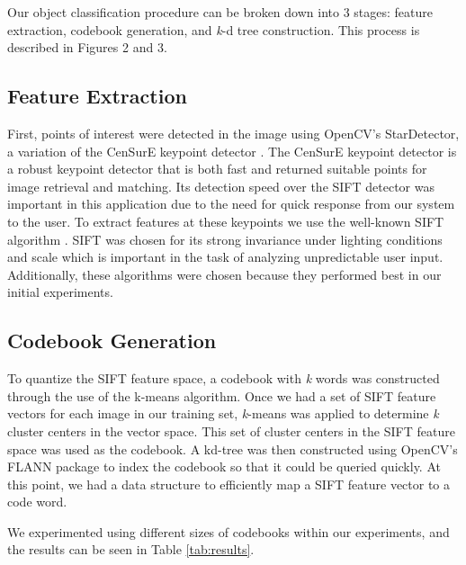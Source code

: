 Our object classification procedure can be broken down into 3 stages: feature
extraction, codebook generation, and \emph{k}-d tree construction.  This process is described in Figures 2 and 3.

\subsection{Feature Extraction}
First, points of interest were detected in the image using OpenCV's StarDetector,
a variation of the CenSurE keypoint detector \cite{agrawal2008censure}. 
The CenSurE keypoint detector is a robust keypoint detector that is both fast and returned suitable points for image retrieval and matching.
Its detection speed over the SIFT detector was important in this application due to the need for quick response from our system to the user.
To extract features at these keypoints we use the well-known SIFT algorithm \cite{lowe1999object}. 
SIFT was chosen for its strong invariance under lighting conditions and scale which is important in the task of analyzing unpredictable user input. 
Additionally, these algorithms were chosen because they performed best in our initial experiments.

\subsection{Codebook Generation}
To quantize the SIFT feature space, a codebook with \emph{k} words was constructed through the use of the k-means algorithm.
Once we had a set of SIFT feature vectors for each image in our training set, \emph{k}-means was applied to determine \emph{k} cluster centers in the vector space. 
This set of cluster centers in the SIFT feature space was used as the codebook. 
A kd-tree was then constructed using OpenCV's FLANN \cite{muja2009fast} package to index the codebook so that it could be queried quickly. 
At this point, we had a data structure to efficiently map a SIFT feature vector to a code word.

We experimented using different sizes of codebooks within our experiments, and the results can be seen in Table \ref{tab:results}.

